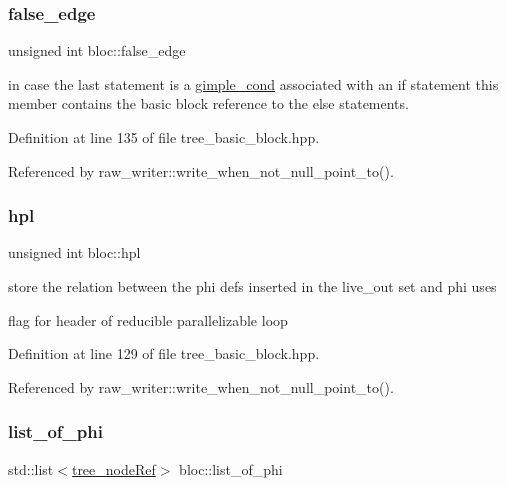 \mbox{\label{structbloc_a6547bb608567a0d14a9ef12a131252c5}} 
\subsubsection{\texorpdfstring{false\+\_\+edge}{false\_edge}}
{\footnotesize\ttfamily unsigned int bloc\+::false\+\_\+edge}



in case the last statement is a \hyperlink{structgimple__cond}{gimple\+\_\+cond} associated with an if statement this member contains the basic block reference to the else statements. 



Definition at line 135 of file tree\+\_\+basic\+\_\+block.\+hpp.



Referenced by raw\+\_\+writer\+::write\+\_\+when\+\_\+not\+\_\+null\+\_\+point\+\_\+to().

\mbox{\label{structbloc_a3f6b9c61ebddb0bc3ada5d334745fd11}} 
\subsubsection{\texorpdfstring{hpl}{hpl}}
{\footnotesize\ttfamily unsigned int bloc\+::hpl}



store the relation between the phi defs inserted in the live\+\_\+out set and phi uses 

flag for header of reducible parallelizable loop 

Definition at line 129 of file tree\+\_\+basic\+\_\+block.\+hpp.



Referenced by raw\+\_\+writer\+::write\+\_\+when\+\_\+not\+\_\+null\+\_\+point\+\_\+to().

\mbox{\label{structbloc_ad1d743b9975088af9f1ea77620d9c7b2}} 
\subsubsection{\texorpdfstring{list\+\_\+of\+\_\+phi}{list\_of\_phi}}
{\footnotesize\ttfamily std\+::list$<$\hyperlink{tree__node_8hpp_a6ee377554d1c4871ad66a337eaa67fd5}{tree\+\_\+node\+Ref}$>$ bloc\+::list\+\_\+of\+\_\+phi\hspace{0.3cm}{\ttfamily [private]}}



